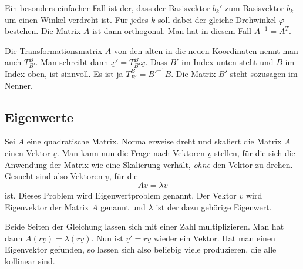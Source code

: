 \documentclass[a4paper,10pt,fleqn,twocolumn,twoside]{article}
\numberwithin{equation}{section}
\begin{document}
Ein besonders einfacher Fall ist der, dass der Basisvektor $b_k'$
zum Basisvektor $b_k$ um einen Winkel verdreht ist. Für jedes $k$
soll dabei der gleiche Drehwinkel $\varphi$ bestehen. Die Matrix
$A$ ist dann orthogonal. Man hat in diesem Fall $A^{-1}=A^T$. 

Die Transformationsmatrix $A$ von den
alten in die neuen Koordinaten nennt man auch $T_{B'}^B$.
Man schreibt dann $\underline x'=T_{B'}^B\underline x$.
Dass $B'$ im Index unten steht und $B$ im Index oben, ist sinnvoll.
Es ist ja $T_{B'}^B=B'^{-1}B$. Die Matrix $B'$ steht sozusagen
im Nenner.

\subsection{Eigenwerte}

Sei $A$ eine quadratische Matrix. Normalerweise dreht und skaliert
die Matrix $A$ einen Vektor $\underline v$. Man kann nun die Frage
nach Vektoren $\underline v$ stellen, für die sich die Anwendung
der Matrix wie eine Skalierung verhält, \textit{ohne} den Vektor zu
drehen. Gesucht sind also Vektoren $\underline v$, für die
\begin{equation}
A\underline v = \lambda\underline v
\end{equation}
ist. Dieses Problem wird Eigenwertproblem genannt. Der Vektor
$\underline v$ wird Eigenvektor der Matrix $A$ genannt und
$\lambda$ ist der dazu gehörige Eigenwert.

Beide Seiten der Gleichung lassen sich mit einer Zahl multiplizieren.
Man hat dann $A(r\underline v)=\lambda(r\underline v)$.
Nun ist $\underline v'=r\underline v$ wieder ein Vektor.
Hat man einen Eigenvektor gefunden, so lassen sich also beliebig
viele produzieren, die alle kollinear sind.
\end{document}
